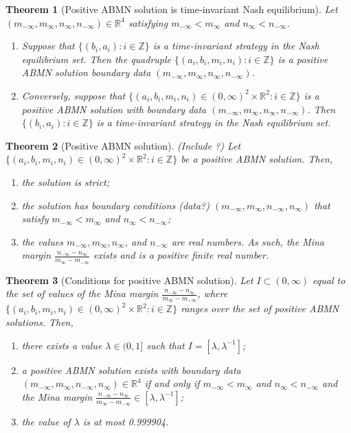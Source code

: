 \documentclass{article}
\newtheorem{theorem}{Theorem}
\newcommand*{\R}{\mathbb{R}}
\newcommand*{\Z}{\mathbb{Z}}
\begin{document}
\begin{theorem}[Positive ABMN solution is time-invariant Nash equilibrium]
    Let $(m_{-\infty},m_{\infty},n_{\infty},n_{-\infty})\in\R^4$ satisfying $m_{-\infty}<m_\infty$
    and $n_\infty<n_{-\infty}$.
    \begin{enumerate}[label=(\arabic*)]
        \item Suppose that $\{(b_i, a_i):i\in\Z\}$ is a time-invariant strategy in the Nash
        equilibrium set. Then the quadruple $\{(a_i,b_i,m_i,n_i):i\in\Z\}$ is a positive ABMN
        solution boundary data $(m_{-\infty},m_{\infty},n_{\infty},n_{-\infty})$.
        \item Conversely, suppose that $\{(a_i,b_i,m_i,n_i)\in(0,\infty)^2\times\R^2:i\in\Z\}$ is a
        positive ABMN solution with boundary data $(m_{-\infty},m_{\infty},n_{\infty},n_{-\infty})$.
        Then $\{(b_i,a_i):i\in\Z\}$ is a time-invariant strategy in the Nash equilibrium set.
    \end{enumerate}
\end{theorem}

\begin{theorem}[Positive ABMN solution] (Include ?) Let $\{(a_i, b_i, m_i,
    n_i)\in(0,\infty)^2\times\R^2:i\in\mathbb{Z}\}$ be a positive ABMN solution. Then,
    \begin{enumerate}[label=(\arabic*)]
        \item the solution is strict;
        \item the solution has boundary conditions (data?) $(m_{-\infty}, m_{\infty}, n_{-\infty},
        n_{\infty})$ that satisfy $m_{-\infty}<m_{\infty}$ and $n_{\infty} < n_{-\infty}$;
        \item the values $m_{-\infty},m_{\infty},n_{\infty}$, and $n_{-\infty}$ are real numbers. As
        such, the Mina margin $\frac{n_{-\infty}-n_{\infty}}{m_{\infty}-m_{-\infty}}$ exists and is
        a positive finite real number.
    \end{enumerate}
\end{theorem}

\begin{theorem}[Conditions for positive ABMN solution]
    Let $I\subset (0,\infty)$ equal to the set of values of the Mina margin
    $\frac{n_{-\infty}-n_{\infty}}{m_{\infty}-m_{-\infty}}$, where $\{(a_i, b_i, m_i,
    n_i)\in(0,\infty)^2\times \R^2:i\in\mathbb{Z}\}$ ranges over the set of positive ABMN solutions.
    Then,
    \begin{enumerate}[label=(\arabic*)]
        \item there exists a value $\lambda\in(0,1]$ such that $I = [\lambda, \lambda^{-1}]$;
        \item a positive ABMN solution exists with boundary data $(m_{-\infty}, m_{\infty},
        n_{-\infty}, n_{\infty})\in\R^4$ if and only if $m_{-\infty}<m_{\infty}$ and $n_{\infty} <
        n_{-\infty}$ and the Mina margin
        $\frac{n_{-\infty}-n_{\infty}}{m_{\infty}-m_{-\infty}}\in[\lambda, \lambda^{-1}]$;
        \item the value of $\lambda$ is at most 0.999904.
    \end{enumerate}
\end{theorem}
\end{document}
